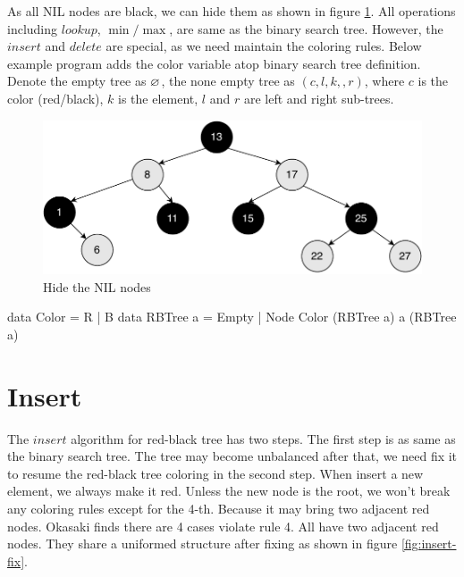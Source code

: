 \documentclass[b5paper]{article}
\begin{document}
As all NIL nodes are black, we can hide them as shown in figure \ref{fig:rbt-example}. All operations including $lookup$, $\min/\max$, are same as the binary search tree. However, the $insert$ and $delete$ are special, as we need maintain the coloring rules. Below example program adds the color variable atop binary search tree definition. Denote the empty tree as $\varnothing$, the none empty tree as $(c, l, k,, r)$, where $c$ is the color (red/black), $k$ is the element, $l$ and $r$ are left and right sub-trees.

\begin{figure}[htbp]
  \centering
  \includegraphics[scale=0.4]{img/rbt-example}
  \caption{Hide the NIL nodes}
  \label{fig:rbt-example}
\end{figure}

\begin{Haskell}
data Color = R | B
data RBTree a = Empty | Node Color (RBTree a) a (RBTree a)
\end{Haskell}

\begin{Exercise}
\end{Exercise}

\section{Insert}

The $insert$ algorithm for red-black tree has two steps. The first step is as same as the binary search tree. The tree may become unbalanced after that, we need fix it to resume the red-black tree coloring in the second step. When insert a new element, we always make it red. Unless the new node is the root, we won't break any coloring rules except for the 4-th. Because it may bring two adjacent red nodes. Okasaki finds there are 4 cases violate rule 4. All have two adjacent red nodes. They share a uniformed structure after fixing\cite{okasaki} as shown in figure \ref{fig:insert-fix}.
\end{document}
